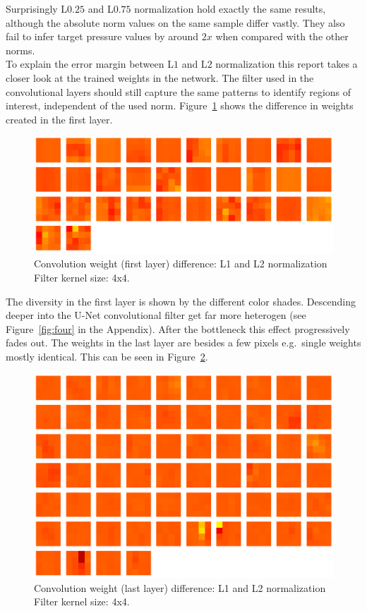 \documentclass[acmtog]{techreportacmart}
\begin{document}
Surprisingly L$0.25$ and L$0.75$ normalization hold exactly the same results, although the absolute norm values on the same sample differ vastly. They also fail to infer target pressure values by around $2x$ when compared with the other norms. \\
To explain the error margin between L$1$ and L$2$ normalization this report takes a closer look at the trained weights in the network. The filter used in the convolutional layers should still capture the same patterns to identify regions of interest, independent of the used norm. Figure~\ref{fig:seven} shows the  difference in weights created in the first layer. 

\begin{figure}[H]
  \includegraphics[width=.3\textwidth]{figures/weights_visualized/diff_layer_1_conv.png}
  \caption{Convolution weight (first layer) difference: L1 and L2 normalization \\ Filter kernel size: 4x4.}
  \label{fig:seven}
\end{figure}

The diversity in the first layer is shown by the different color shades. Descending deeper into the U-Net convolutional filter get far more heterogen (see Figure~\ref{fig:four} in the Appendix). After the bottleneck this effect progressively fades out. The weights in the last layer are besides a few pixels e.g.\ single weights mostly identical. This can be seen in Figure~\ref{fig:eight}.

\begin{figure}[H]
  \includegraphics[width=.3\textwidth]{figures/weights_visualized/diff_layer_14_conv.png}
  \caption{Convolution weight (last layer) difference: L1 and L2 normalization \\ Filter kernel size: 4x4.}
  \label{fig:eight}
\end{figure}
\end{document}
